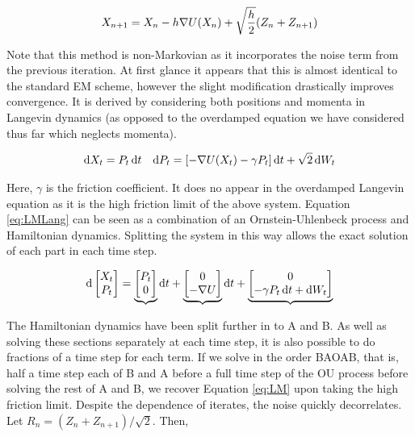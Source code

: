 \begin{equation} X_{n+1} = X_n - h \nabla U (X_n) +\sqrt{\frac{h}{2}} (Z_n+Z_{n+1}) \label{eq:LM} \end{equation}

Note that this method is non-Markovian as it incorporates the noise term from the previous iteration. At first glance it appears that this is almost identical to the standard EM scheme, however the slight modification drastically improves convergence.  It is derived by considering both positions and momenta in Langevin dynamics (as opposed to the overdamped equation we have considered thus far which neglects momenta).

\begin{align} \mathop{}\!\mathrm{d} X_t = P_t \mathop{}\!\mathrm{d} t && \mathop{}\!\mathrm{d} P_t = \lbrack -\nabla U(X_t) - \gamma P_t \rbrack \mathop{}\!\mathrm{d} t + \sqrt{2} \mathop{}\!\mathrm{d} W_t \label{eq:LMLang} \end{align}

Here, \(\gamma\) is the friction coefficient. It does no appear in the overdamped Langevin equation as it is the high friction limit of the above system.  Equation \eqref{eq:LMLang} can be seen as a combination of an Ornstein-Uhlenbeck process and Hamiltonian dynamics. Splitting the system in this way allows the exact solution of each part in each time step.

\[ \mathop{}\!\mathrm{d} \begin{bmatrix} X_t\\P_t \end{bmatrix} = \underbrace{\begin{bmatrix} P_t \\ 0 \end{bmatrix}} \mathop{}\!\mathrm{d} t + \underbrace{\begin{bmatrix}  0\\-\nabla U \end{bmatrix}} \mathop{}\!\mathrm{d} t + \underbrace{\begin{bmatrix} 0\\ -\gamma P_t \mathop{}\!\mathrm{d} t + \mathop{}\!\mathrm{d} W_t \end{bmatrix}} \]

The Hamiltonian dynamics have been split further in to A and B.  As well as solving these sections separately at each time step, it is also possible to do fractions of a time step for each term. If we solve in the order BAOAB, that is, half a time step each of B and A before a full time step of the OU process before solving the rest of A and B, we recover Equation \eqref{eq:LM} upon taking the high friction limit. Despite the dependence of iterates, the noise quickly decorrelates. Let \(R_n = (Z_n+Z_{n+1})/\sqrt{2}\). Then,

